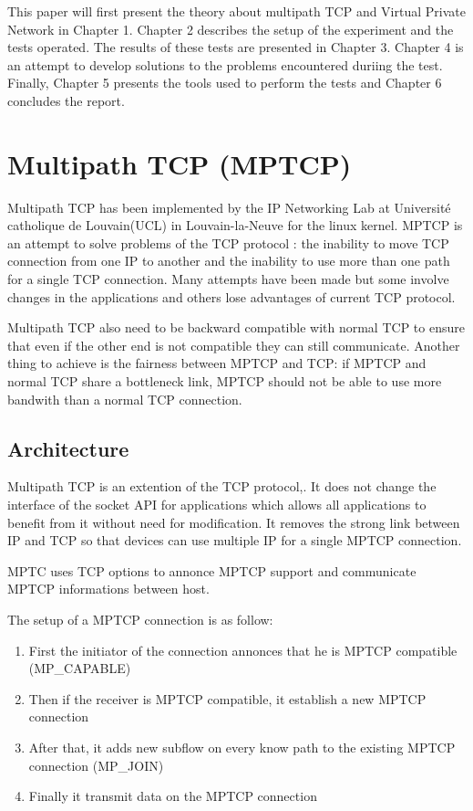   This paper will first present the theory about multipath TCP and Virtual Private Network in Chapter 1. Chapter 2 describes the setup of the experiment and the tests operated.
  The results of these tests are presented in Chapter 3. Chapter 4 is an attempt to develop solutions to the problems encountered duriing the test. Finally, Chapter 5 presents the tools used
  to perform the tests and Chapter 6 concludes the report.

  \section{Multipath TCP (MPTCP)} \label{sec:mptcp_exp}

  Multipath TCP has been implemented by the IP Networking Lab at Université catholique de Louvain(UCL) in Louvain-la-Neuve for the linux kernel.
  MPTCP is an attempt to solve problems of the TCP protocol : the inability to move TCP connection from one IP to another and the inability to use more than one path for a single TCP connection.
  Many attempts have been made but some involve changes in the applications and others lose advantages of current TCP protocol.

  Multipath TCP also need to be backward compatible with normal TCP to ensure that even if the other end is not compatible they can still communicate.
  Another thing to achieve is the fairness between MPTCP and TCP: if MPTCP and normal TCP share a bottleneck link, MPTCP should not be able to use more bandwith than a normal TCP connection.

  \subsection{Architecture}

  Multipath TCP is an extention of the TCP protocol,. It does not change the interface of the socket API for applications which allows all applications to benefit from it
  without need for modification.
  It removes the strong link between IP and TCP so that devices can use multiple IP for a single MPTCP connection.

  MPTC uses TCP options to annonce MPTCP support and communicate MPTCP informations between host.

  The setup of a MPTCP connection is as follow:

  \begin{enumerate}
    \item First the initiator of the connection annonces that he is MPTCP compatible (MP\_CAPABLE)
    \item Then if the receiver is MPTCP compatible, it establish a new MPTCP connection
    \item After that, it adds new subflow on every know path to the existing MPTCP connection (MP\_JOIN)
    \item Finally it transmit data on the MPTCP connection
  \end{enumerate}

